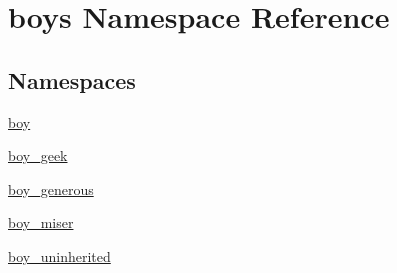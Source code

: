 \hypertarget{namespaceboys}{}\section{boys Namespace Reference}
\label{namespaceboys}
\subsection*{Namespaces}
\begin{DoxyCompactItemize}
\item 
 \hyperlink{namespaceboys_1_1boy}{boy}
\item 
 \hyperlink{namespaceboys_1_1boy__geek}{boy\+\_\+geek}
\item 
 \hyperlink{namespaceboys_1_1boy__generous}{boy\+\_\+generous}
\item 
 \hyperlink{namespaceboys_1_1boy__miser}{boy\+\_\+miser}
\item 
 \hyperlink{namespaceboys_1_1boy__uninherited}{boy\+\_\+uninherited}
\end{DoxyCompactItemize}
